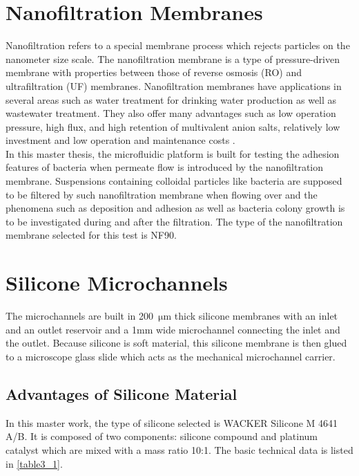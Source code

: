 \section{Nanofiltration Membranes}
\label{3_1}
Nanofiltration refers to a special membrane process which rejects particles on the nanometer size scale. The nanofiltration membrane is a type of pressure-driven membrane with properties between those of reverse osmosis (RO) and ultrafiltration (UF) membranes. Nanofiltration membranes have applications in several areas such as water treatment for drinking water production as well as wastewater treatment. They also offer many advantages such as low operation pressure, high flux, and high retention of multivalent anion salts, relatively low investment and low operation and maintenance costs \cite{hilal2004comprehensive}. \\

In this master thesis, the microfluidic platform is built for testing the adhesion features of bacteria when permeate flow is introduced by the nanofiltration membrane. Suspensions containing colloidal particles like bacteria are supposed to be filtered by such nanofiltration membrane when flowing over and the phenomena such as deposition and adhesion as well as bacteria colony growth is to be investigated during and after the filtration. The type of the nanofiltration membrane selected for this test is NF90.

\section{Silicone Microchannels}
\label{3_2}
The microchannels are built in 200~$\mathrm{\mu m}$ thick silicone membranes with an inlet and an outlet reservoir and a 1mm wide microchannel connecting the inlet and the outlet. Because silicone is soft material, this silicone membrane is then glued to a microscope glass slide which acts as the mechanical microchannel carrier.

\subsection{Advantages of Silicone Material }
\label{3_2_1}
In this master work, the type of silicone selected is WACKER Silicone M 4641 A/B. It is composed of two components: silicone compound and platinum catalyst which are mixed with a mass ratio 10:1. The basic technical data is listed in \autoref{table3_1}.\\

